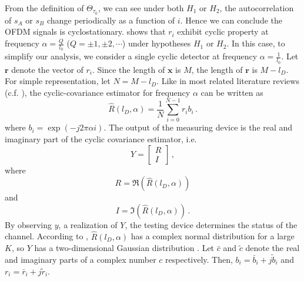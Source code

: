 From the definition of $\Theta_{\tau_0}$, we can see under both $H_1$ or $H_2$, the autocorrelation of $s_A$ or $s_B$ change periodically as a function of $i$. Hence we can conclude the OFDM signals is cyclostationary.  
\cite{lunden2007spectrum} shows that $r_i$ exhibit cyclic property at frequency $\alpha = \frac{Q}{l_0}$ ($Q = \pm1, \pm2, \cdots$) under hypotheses $H_1$ or $H_2$. In this case, to simplify our analysis, we consider a single cyclic detector at frequency $\alpha = \frac{1}{l_0}$. 
Let $\mathbf{r}$ denote the vector of $r_i$. Since the length of $\mathbf{x}$ is $M$, the length of $\mathbf{r}$ is $M - l_D$. For simple representation, let $N = M - l_D$.
Like in most related literature reviews (c.f. \cite{lunden2010robust} \cite{dandawate1994statistical}), the cyclic-covariance estimator for frequency $\alpha$ can be written as
\begin{equation}
  \hat{R}(l_D, \alpha) = \frac{1}{N}\sum_{i=0}^{N-1} r_ib_i\,.
  \label{cyclicR}
\end{equation}
where $b_i = \exp(-j2\pi\alpha i)$. 
The output of the measuring device is the real and imaginary part of the cyclic covariance estimator, i.e. 
\begin{equation}
  Y = \begin{bmatrix}
	R \\
	I
  \end{bmatrix}\,,
  \label{cyclic_cov}
\end{equation}
where 
\[
  R = \Re(\hat{R}(l_D, \alpha))
\]
and 
\[
  I = \Im(\hat{R}(l_D, \alpha))\,.
\]
By observing $y$, a realization  of $Y$, the testing device determines the status of the channel.
According to \cite{lunden2010robust}, $\hat{R}(l_D, \alpha)$ has a complex normal distribution for a large $K$, so $Y$ has a two-dimensional Gaussian distribution \cite{goodman1963statistical}.
Let $\bar{c}$ and $\tilde{c}$ denote the real and imaginary parts of a complex number $c$ respectively. Then, $b_i = \bar{b}_i + j\tilde{b}_i$  and $r_i = \bar{r}_i + j\tilde{r}_i$. 


